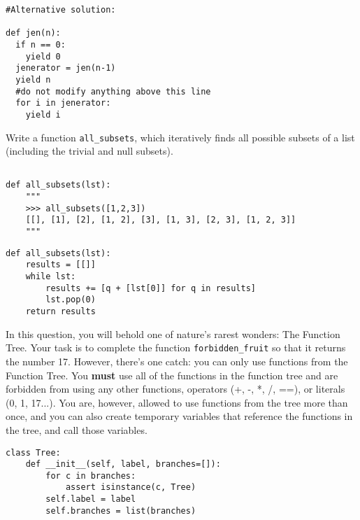 \documentclass{exam}
\begin{document}
\begin{questions}
\begin{blocksection}
\begin{solution}
\begin{lstlisting}
#Alternative solution:

def jen(n):
  if n == 0:
    yield 0
  jenerator = jen(n-1)
  yield n
  #do not modify anything above this line
  for i in jenerator:
    yield i
\end{lstlisting}    
\end{solution}
\end{blocksection}

\pagebreak

\begin{blocksection}
\question Write a function \lstinline$all_subsets$, which iteratively finds all possible subsets of a list (including the trivial and null subsets).
\begin{lstlisting}

def all_subsets(lst):
    """
    >>> all_subsets([1,2,3])
    [[], [1], [2], [1, 2], [3], [1, 3], [2, 3], [1, 2, 3]]
    """

\end{lstlisting}

\begin{solution}
\begin{lstlisting}
def all_subsets(lst):
    results = [[]]
    while lst:
        results += [q + [lst[0]] for q in results]
        lst.pop(0)
    return results
\end{lstlisting}    
\end{solution}

\end{blocksection}

\pagebreak

\begin{blocksection}
\question In this question, you will behold one of nature's rarest wonders: The Function Tree. Your task is to complete the function \lstinline$forbidden_fruit$ so that it returns the number 17. However, there's one catch: you can only use functions from the Function Tree. You \textbf{must} use all of the functions in the function tree and are forbidden from using any other functions, operators (+, -, *, /, ==), or literals (0, 1, 17...). You are, however, allowed to use functions from the tree more than once, and you can also create temporary variables that reference the functions in the tree, and call those variables. 

\begin{lstlisting}
class Tree:
    def __init__(self, label, branches=[]):
        for c in branches:
            assert isinstance(c, Tree)
        self.label = label
        self.branches = list(branches)


\end{lstlisting}
\end{blocksection}
\end{questions}
\end{document}
